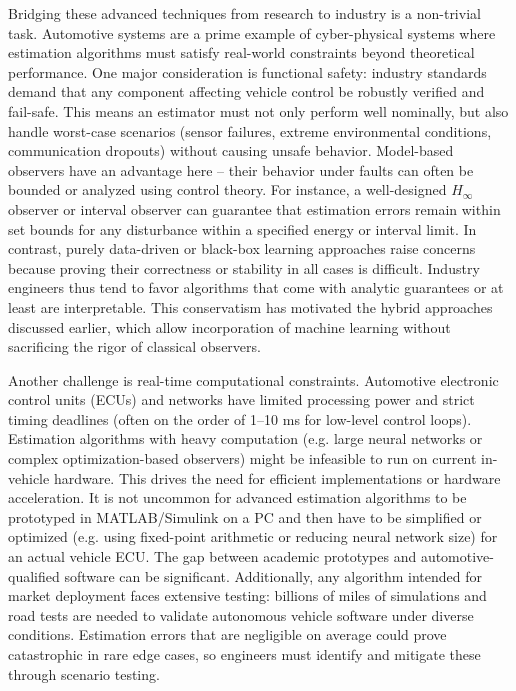 Bridging these advanced techniques from research to industry is a non-trivial task. Automotive systems are a prime example of cyber-physical systems where estimation algorithms must satisfy real-world constraints beyond theoretical performance. One major consideration is functional safety: industry standards demand that any component affecting vehicle control be robustly verified and fail-safe. This means an estimator must not only perform well nominally, but also handle worst-case scenarios (sensor failures, extreme environmental conditions, communication dropouts) without causing unsafe behavior. Model-based observers have an advantage here – their behavior under faults can often be bounded or analyzed using control theory. For instance, a well-designed $H_\infty$ observer or interval observer can guarantee that estimation errors remain within set bounds for any disturbance within a specified energy or interval limit. In contrast, purely data-driven or black-box learning approaches raise concerns because proving their correctness or stability in all cases is difficult. Industry engineers thus tend to favor algorithms that come with analytic guarantees or at least are interpretable. This conservatism has motivated the hybrid approaches discussed earlier, which allow incorporation of machine learning without sacrificing the rigor of classical observers.

Another challenge is real-time computational constraints. Automotive electronic control units (ECUs) and networks have limited processing power and strict timing deadlines (often on the order of 1–10 ms for low-level control loops). Estimation algorithms with heavy computation (e.g. large neural networks or complex optimization-based observers) might be infeasible to run on current in-vehicle hardware. This drives the need for efficient implementations or hardware acceleration. It is not uncommon for advanced estimation algorithms to be prototyped in MATLAB/Simulink on a PC and then have to be simplified or optimized (e.g. using fixed-point arithmetic or reducing neural network size) for an actual vehicle ECU. The gap between academic prototypes and automotive-qualified software can be significant. Additionally, any algorithm intended for market deployment faces extensive testing: billions of miles of simulations and road tests are needed to validate autonomous vehicle software under diverse conditions. Estimation errors that are negligible on average could prove catastrophic in rare edge cases, so engineers must identify and mitigate these through scenario testing.

